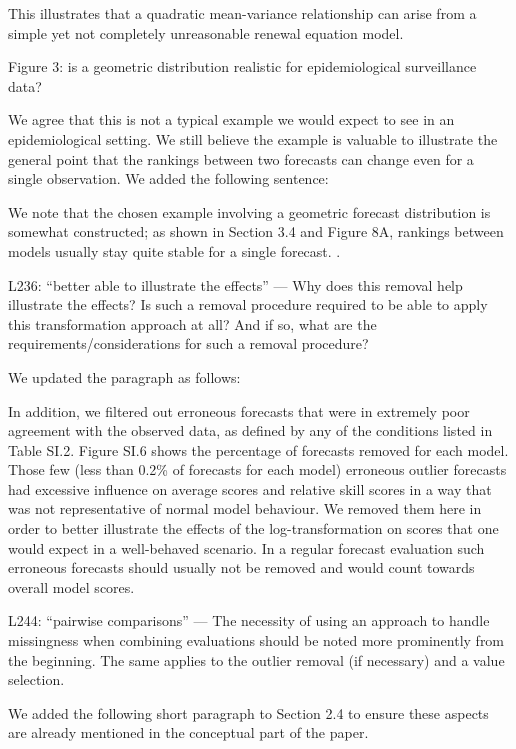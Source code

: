 \documentclass{article}
\newcommand{\black}{\color{black}}
\newcommand{\blue}{\color{blue}}
\newcommand{\indented}{\setlength{\leftskip}{1cm}}
\newcommand{\notindented}{\setlength{\leftskip}{0cm}}
\begin{document}
This illustrates that a quadratic mean-variance relationship can arise from a simple yet not completely unreasonable renewal equation model.

\blue
Figure 3: is a geometric distribution realistic for epidemiological surveillance data?

\black
We agree that this is not a typical example we would expect to see in an epidemiological setting. We still believe the example is valuable to illustrate the general point that the rankings between two forecasts can change even for a single observation. We added the following sentence:

\indented
We note that the chosen example involving a geometric forecast distribution is somewhat constructed; as shown in Section 3.4 and Figure 8A, rankings between models usually stay quite stable for a single forecast. .

\notindented


\blue
L236: “better able to illustrate the effects” — Why does this removal help illustrate the effects? Is such a removal procedure required to be able to apply this transformation approach at all? And if so, what are the requirements/considerations for such a removal procedure?

\black
We updated the paragraph as follows: 

\indented
In addition, we filtered out erroneous forecasts that were in extremely poor agreement with the observed data, as defined by any of the conditions listed in Table SI.2. Figure SI.6 shows the percentage of forecasts removed for each model. Those few (less than 0.2\%  of forecasts for each model) erroneous outlier forecasts had excessive influence on average scores and relative skill scores in a way that was not representative of normal model behaviour. We removed them here in order to better illustrate the effects of the log-transformation on scores that one would expect in a well-behaved scenario. In a regular forecast evaluation such erroneous forecasts should usually not be removed and would count towards overall model scores.

\notindented

\blue
L244: “pairwise comparisons” — The necessity of using an approach to handle missingness when combining evaluations should be noted more prominently from the beginning. The same applies to the outlier removal (if necessary) and a value selection.

\black
We added the following short paragraph to Section 2.4 to ensure these aspects are already mentioned in the conceptual part of the paper.
\end{document}
